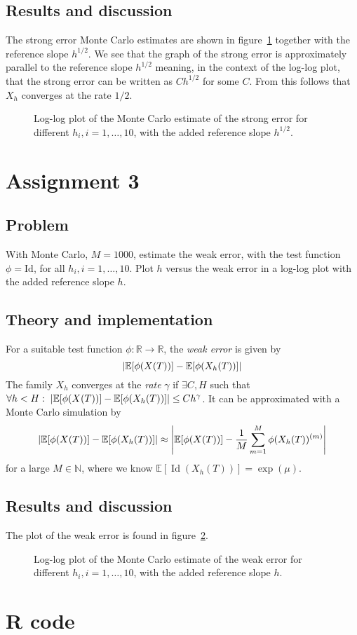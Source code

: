 \documentclass[11pt, a4paper]{article}
\let\originalleft\left
\let\originalright\right
\renewcommand{\left}{\mathopen{}\mathclose\bgroup\originalleft}
\renewcommand{\right}{\aftergroup\egroup\originalright}
\DeclareMathOperator{\Id}{Id}
\begin{document}
\subsection{Results and discussion}
The strong error Monte Carlo estimates are shown in figure~\ref{fig:strong_error}
together with the reference slope $h^{1/2}$.
We see that the graph of the strong error is approximately parallel to the
reference slope $h^{1/2}$ meaning, in the context of the log-log plot,
that the strong error can be written as $Ch^{1/2}$ for some $C$.
From this follows that $X_h$ converges at the rate $1/2$.

\begin{figure}
	\centering
	
	\caption{Log-log plot of the Monte Carlo estimate of the strong error for different $h_i, i = 1, \ldots, 10$,
	with the added reference slope $h^{1/2}$. \label{fig:strong_error}}
\end{figure}

\section{Assignment 3}
\subsection{Problem}
With Monte Carlo, $M = 1000$, estimate the weak error,
with the test function $\phi = \mathrm{Id}$,
for all $h_i, i = 1, \ldots, 10$.
Plot $h$ versus the weak error in a log-log plot with the added reference slope $h$.
\subsection{Theory and implementation}
For a suitable test function $\phi: \mathbb R \to \mathbb R$,
the \emph{weak error} is given by
\def\weakerror{\left|\mathbb E[\phi(X(T))] - \mathbb E[\phi(X_h(T))]\right|}
$$ \weakerror $$
The family $X_h$ converges at the \emph{rate} $\gamma$
if $\exists C, H$ such that $\forall h < H: \; \weakerror \le Ch^\gamma$.
It can be approximated with a Monte Carlo simulation by
$$ \weakerror \approx \left|\mathbb E[\phi(X(T))] - \frac1M \sum_{m=1}^M \phi(X_h(T))^{(m)}\right| $$
for a large $M \in \mathbb N$,
where we know $\mathbb E[\Id(X_h(T))] = \exp(\mu)$.
\subsection{Results and discussion}
The plot of the weak error is found in figure~\ref{fig:weak_error}.

\begin{figure}
	\centering
	
	\caption{Log-log plot of the Monte Carlo estimate of the weak error for different $h_i, i = 1, \ldots, 10$,
	with the added reference slope $h$. \label{fig:weak_error}}
\end{figure}

\clearpage
\appendix %

\section{R code}

\end{document}
